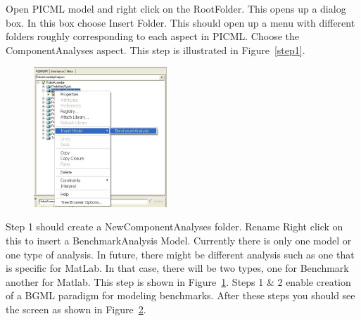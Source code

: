 \documentclass[onecolumn]{article}
\begin{document}
Open PICML model and right click on the RootFolder. This opens up a
dialog box. In this box choose Insert Folder. This should open up a
menu with different folders roughly corresponding to each aspect in
PICML. Choose the ComponentAnalyses aspect. This step is illustrated in
Figure~\ref{step1}.

\begin{figure}[ht]
{
 \includegraphics[width=5cm]{Insert-Benchmark.png}
  \label{step2}
}
\end{figure}

Step 1 should create a NewComponentAnalyses folder. Rename Right click
on this to insert a BenchmarkAnalysis Model. Currently there is only
one model or one type of analysis. In future, there might be different
analysis such as one that is specific for MatLab. In that case, there
will be two types, one for Benchmark another for Matlab. This step is
shown in Figure~\ref{step2}. Steps 1 \& 2 enable creation of a BGML
paradigm for modeling benchmarks. After these steps you should see the
screen as shown in Figure~\ref{step3}.

\begin{figure}[htpb]
\label{step3}
\end{figure}
\end{document}
